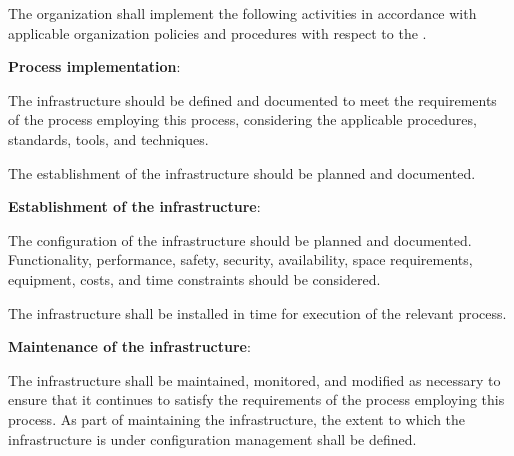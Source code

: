 			\begin{adjustwidth}{2em}{0pt} 

				The organization shall implement the following activities in accordance with applicable organization policies and procedures with respect to the .

				\begin{compactenum}

					\item {\bf Process implementation}:

					\begin{compactenum}
						
						\item The infrastructure should be defined and documented to meet the requirements of the process employing this process, considering the applicable procedures, standards, tools, and techniques.

						\item The establishment of the infrastructure should be planned and documented.

					\end{compactenum}

					\item {\bf Establishment of the infrastructure}:

					\begin{compactenum}
						
						\item The configuration of the infrastructure should be planned and documented. Functionality, performance, safety, security, availability, space requirements, equipment, costs, and time constraints should be considered.

						\item The infrastructure shall be installed in time for execution of the relevant process.

					\end{compactenum}

					\item {\bf Maintenance of the infrastructure}:

					\begin{compactenum}
						
						\item The infrastructure shall be maintained, monitored, and modified as necessary to ensure that it continues to satisfy the requirements of the process employing this process. As part of maintaining the infrastructure, the extent to which the infrastructure is under configuration management shall be defined.

					\end{compactenum}

				\end{compactenum}

			\end{adjustwidth}

